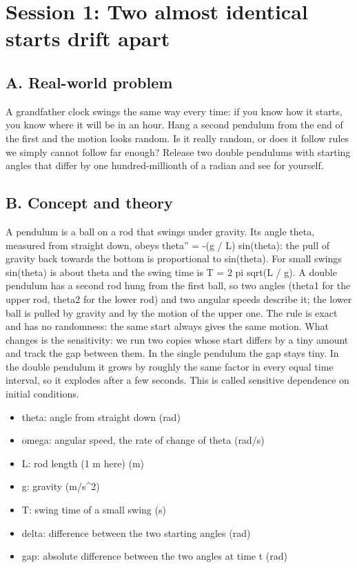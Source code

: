 \documentclass[11pt,a4paper]{article}
\begin{document}
\section{Session 1: Two almost identical starts drift apart}

\subsection*{A. Real-world problem}
A grandfather clock swings the same way every time: if you know how it starts, you know where it will be in an hour. Hang a second pendulum from the end of the first and the motion looks random. Is it really random, or does it follow rules we simply cannot follow far enough? Release two double pendulums with starting angles that differ by one hundred-millionth of a radian and see for yourself.

\subsection*{B. Concept and theory}
A pendulum is a ball on a rod that swings under gravity. Its angle theta, measured from straight down, obeys theta'' = -(g / L) sin(theta): the pull of gravity back towards the bottom is proportional to sin(theta). For small swings sin(theta) is about theta and the swing time is T = 2 pi sqrt(L / g). A double pendulum has a second rod hung from the first ball, so two angles (theta1 for the upper rod, theta2 for the lower rod) and two angular speeds describe it; the lower ball is pulled by gravity and by the motion of the upper one. The rule is exact and has no randomness: the same start always gives the same motion. What changes is the sensitivity: we run two copies whose start differs by a tiny amount and track the gap between them. In the single pendulum the gap stays tiny. In the double pendulum it grows by roughly the same factor in every equal time interval, so it explodes after a few seconds. This is called sensitive dependence on initial conditions.

\begin{itemize}[nosep]
\item theta: angle from straight down (rad)
\item omega: angular speed, the rate of change of theta (rad/s)
\item L: rod length (1 m here) (m)
\item g: gravity (m/s\textasciicircum{}2)
\item T: swing time of a small swing (s)
\item delta: difference between the two starting angles (rad)
\item gap: absolute difference between the two angles at time t (rad)
\end{itemize}
\end{document}

